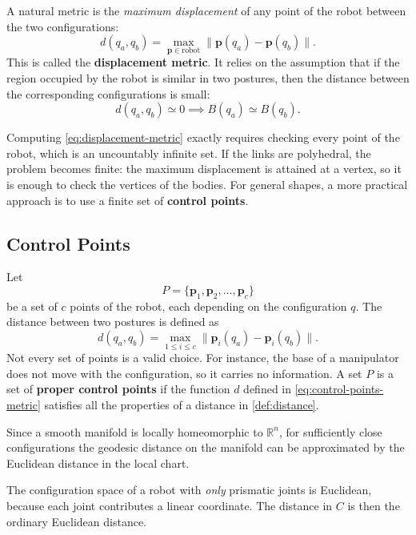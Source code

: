 A natural metric is the \emph{maximum displacement} of any point of
the robot between the two configurations:
\begin{equation}
\label{eq:displacement-metric}
d(q_a, q_b) = \max_{\mathbf{p} \in \text{robot}}
    \|\mathbf{p}(q_a) - \mathbf{p}(q_b)\|.
\end{equation}
This is called the \textbf{displacement metric}. It relies on the
assumption that if the region occupied by the robot is similar in two
postures, then the distance between the corresponding configurations is
small:
\[
d(q_a, q_b) \simeq 0 \implies B(q_a) \simeq B(q_b).
\]

Computing \cref{eq:displacement-metric} exactly requires checking
every point of the robot, which is an uncountably infinite set. If the
links are polyhedral, the problem becomes finite: the maximum
displacement is attained at a vertex, so it is enough to check the
vertices of the bodies. For general shapes, a more practical approach is
to use a finite set of \textbf{control points}.

\subsection{Control Points}
\label{subsec:control-points}

Let
\[
P = \{ \mathbf{p}_1, \mathbf{p}_2, \dots, \mathbf{p}_c \}
\]
be a set of \( c \) points of the robot, each depending on the
configuration \( q \). The distance between two postures is defined as
\begin{equation}
\label{eq:control-points-metric}
d(q_a, q_b) = \max_{1 \le i \le c}
    \|\mathbf{p}_i(q_a) - \mathbf{p}_i(q_b)\|.
\end{equation}
Not every set of points is a valid choice. For instance, the base of a
manipulator does not move with the configuration, so it carries no
information. A set \( P \) is a set of \textbf{proper control points}
if the function \( d \) defined in \cref{eq:control-points-metric}
satisfies all the properties of a distance in
\cref{def:distance}.

\begin{nb}
Since a smooth manifold is locally homeomorphic to \( \mathbb{R}^n \),
for sufficiently close configurations the geodesic distance on the
manifold can be approximated by the Euclidean distance in the local
chart.
\end{nb}

\begin{nb}
The configuration space of a robot with \emph{only} prismatic joints
is Euclidean, because each joint contributes a linear coordinate.
The distance in \( C \) is then the ordinary Euclidean distance.
\end{nb}

